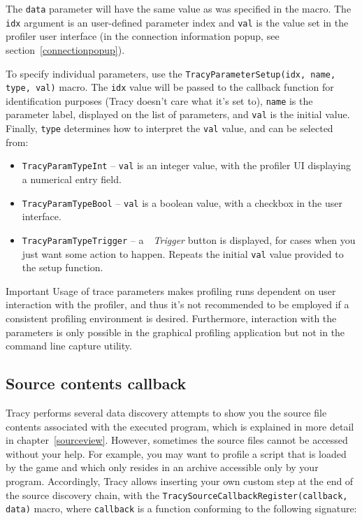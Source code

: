 \documentclass[hidelinks,titlepage,a4paper,twoside]{article}
\begin{document}
The \texttt{data} parameter will have the same value as was specified in the macro. The \texttt{idx} argument is an user-defined parameter index and \texttt{val} is the value set in the profiler user interface (in the connection information popup, see section~\ref{connectionpopup}).

To specify individual parameters, use the \texttt{TracyParameterSetup(idx, name, type, val)} macro. The \texttt{idx} value will be passed to the callback function for identification purposes (Tracy doesn't care what it's set to), \texttt{name} is the parameter label,  displayed on the list of parameters, and \texttt{val} is the initial value. Finally, \texttt{type} determines how to interpret the \texttt{val} value, and can be selected from:

\begin{itemize}
\item \texttt{TracyParamTypeInt} -- \texttt{val} is an integer value, with the profiler UI displaying a numerical entry field.
\item \texttt{TracyParamTypeBool} -- \texttt{val} is a boolean value, with a checkbox in the user interface.
\item \texttt{TracyParamTypeTrigger} -- a~\emph{\faCircleDot{}~Trigger} button is displayed, for cases when you just want some action to happen. Repeats the initial \texttt{val} value provided to the setup function.
\end{itemize}

\begin{bclogo}[
noborder=true,
couleur=black!5,
logo=\bcbombe
]{Important}
Usage of trace parameters makes profiling runs dependent on user interaction with the profiler, and thus it's not recommended to be employed if a consistent profiling environment is desired. Furthermore, interaction with the parameters is only possible in the graphical profiling application but not in the command line capture utility.
\end{bclogo}

\subsection{Source contents callback}

Tracy performs several data discovery attempts to show you the source file contents associated with the executed program, which is explained in more detail in chapter~\ref{sourceview}. However, sometimes the source files cannot be accessed without your help. For example, you may want to profile a script that is loaded by the game and which only resides in an archive accessible only by your program. Accordingly, Tracy allows inserting your own custom step at the end of the source discovery chain, with the \texttt{TracySourceCallbackRegister(callback, data)} macro, where \texttt{callback} is a function conforming to the following signature:
\end{document}
